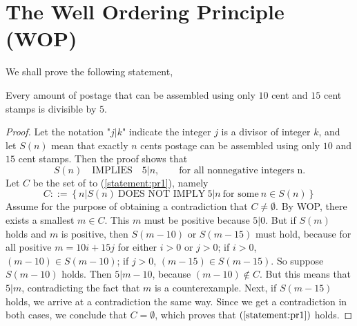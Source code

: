 \chapter{The Well Ordering Principle (WOP)}

\begin{pr}
    We shall prove the following statement,
    \begin{lemPr}
        Every amount of postage that can be assembled using only $10$ cent
        and $15$ cent stamps is divisible by $5$.
    \end{lemPr}

    \begin{proof}
        Let the notation "$j\left|\right.k$" indicate the integer $j$
        is a divisor of integer $k$, and let $S(n)$ mean that exactly $n$ cents
        postage can be assembled using only $10$ and $15$ cent stamps. Then
        the proof shows that
        \begin{equation} \label{statement:pr1}
            S(n) \quad \text{IMPLIES} \quad 5 \left|\right. n, \qquad \text{for all nonnegative integers n.}
        \end{equation}
        Let $C$ be the set of  to (\ref{statement:pr1}), namely
        \begin{equation*}
            C ::= \left\{ n \left|\right. S(n) \ \text{DOES NOT IMPLY} \ 5 \left|\right. n \ \text{for some} \ n \in S(n) \right\}
        \end{equation*}
        Assume for the purpose of obtaining a contradiction that $C \neq \emptyset$.
        By WOP, there exists a smallest $m \in C$. This $m$ must be positive
        because $5 \left|\right. 0$.
        \beautyBr
        But if $S(m)$ holds and $m$ is positive, then $S(m - 10)$ or $S(m - 15)$
        must hold, because for all positive $m = 10i + 15j$ for either $i > 0$ or $j > 0$; if
        $i > 0$, $(m - 10) \in S(m - 10)$; if $j > 0$, $(m - 15) \in S(m - 15)$.
        \beautyBr
        So suppose $S(m - 10)$ holds. Then $5 \left|\right. m - 10$, because $(m - 10) \notin C$.
        \beautyBr
        But this means that $5 \left|\right. m$, contradicting the fact that
        $m$ is a counterexample.
        \beautyBr
        Next, if $S(m - 15)$ holds, we arrive at a contradiction the same way.
        \beautyBr
        Since we get a contradiction in both cases, we conclude that $C = \emptyset$,
        which proves that $(\ref{statement:pr1})$ holds.
    \end{proof}
\end{pr}
